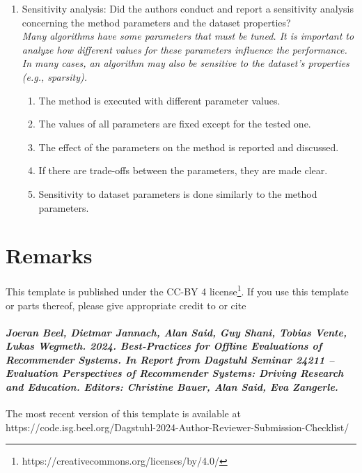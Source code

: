 \documentclass{article}
\begin{document}
\begin{enumerate}
    \item Sensitivity analysis: 
    Did the authors conduct and report a sensitivity analysis concerning the method parameters and the dataset properties? 
    \\ \emph{Many algorithms have some parameters that must be tuned. It is important to analyze how different values for these parameters influence the performance. In many cases, an algorithm may also be sensitive to the dataset's properties (e.g., sparsity).}
    \begin{enumerate} [label*=\arabic*.]
        \item The method is executed with different parameter values.
        \item The values of all parameters are fixed except for the tested one.
        \item The effect of the parameters on the method is reported and discussed.
        \item If there are trade-offs between the parameters, they are made clear.
        \item Sensitivity to dataset parameters is done similarly to the method parameters.
    \end{enumerate}
\end{enumerate}

\section{Remarks}

This template is published under the CC-BY 4 license\footnote{https://creativecommons.org/licenses/by/4.0/}. If you use this template or parts thereof, please give appropriate credit to or cite

\paragraph{\textit{Joeran Beel, Dietmar Jannach, Alan Said, Guy Shani, Tobias Vente, Lukas Wegmeth. 2024. Best-Practices for Offline Evaluations of Recommender Systems. In Report from Dagstuhl Seminar 24211 -- Evaluation Perspectives of Recommender Systems: Driving Research and Education. Editors: Christine Bauer, Alan Said, Eva Zangerle.} }


The most recent version of this template is available at https://code.isg.beel.org/Dagstuhl-2024-Author-Reviewer-Submission-Checklist/
\end{document}
